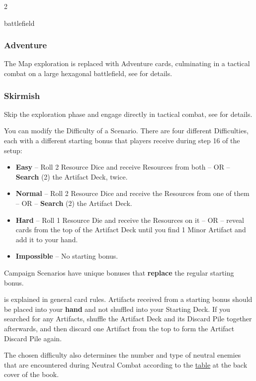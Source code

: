 \begin{multicols*}{2}
\begin{expansion}[before=\vspace*{-10mm}]{battlefield}
  \subsubsection*{Adventure}
  The Map exploration is replaced with Adventure cards, culminating in a tactical combat on a large hexagonal battlefield, see  for details.

  \subsubsection*{Skirmish}
  Skip the exploration phase and engage directly in tactical combat, see  for details.
\end{expansion}


    You can modify the Difficulty of a Scenario.
    There are four different Difficulties, each with a different starting bonus that players receive during step 16 of the setup:
    \begin{itemize}
        \item \textbf{Easy} – Roll 2 Resource Dice  and receive Resources from both – OR – \textbf{Search} (2) the Artifact Deck, twice.
        \item \textbf{Normal} – Roll 2 Resource Dice  and receive the Resources from one of them – OR – \textbf{Search} (2) the Artifact Deck.
        \item \textbf{Hard} – Roll 1 Resource Die  and receive the Resources on it – OR – reveal cards from the top of the Artifact Deck until you find 1 Minor Artifact and add it to your hand.
        \item \textbf{Impossible} – No starting bonus.
    \end{itemize}
    \columnbreak

    Campaign Scenarios have unique bonuses that \textbf{replace} the regular starting bonus.

     is explained in general card rules. Artifacts received from a starting bonus should be placed into your \textbf{hand} and not shuffled into your Starting Deck.
    If you searched for any Artifacts, shuffle the Artifact Deck and its Discard Pile together afterwards, and then discard one Artifact from the top to form the Artifact Discard Pile again.\par
    The chosen difficulty also determines the number and type of neutral enemies that are encountered during Neutral Combat according to the \hyperlink{Difficulty Table}{table} at the back cover of the book.


\end{multicols*}
